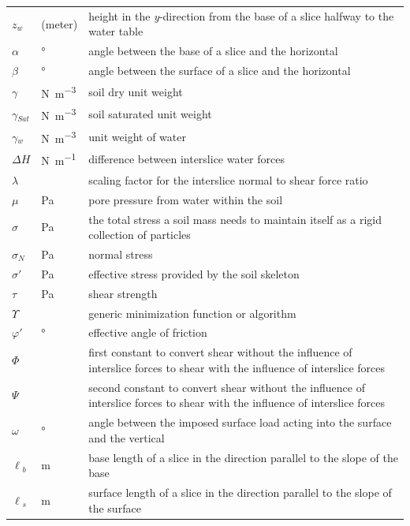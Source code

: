 \documentclass[12pt]{article}
\renewcommand{\arraystretch}{1}
\begin{document}
\begin{longtable*}{  l  l  p{8.5cm}  }
$z_w$ & (\si{meter})& height in the \textit{y}-direction from the base of a 
slice halfway to the water table
\\
$\alpha{}$ & \si{\degree} & angle between the base of a slice and the horizontal
\\
$\beta{}$ &\si{\degree} & angle between the surface of a slice and the 
horizontal
\\
$\gamma{}$ & \si{\newton\per\cubic\meter} & soil dry unit weight
\\
${\gamma{}_{Sat}}$ &  \si{\newton\per\cubic\meter} & soil saturated unit weight
\\
${\gamma{}_{w}}$ & \si{\newton\per\cubic\meter} & unit weight of water
\\
$\Delta{}H$ & \si{\newton\per\meter} & difference between interslice water 
forces
\\
$\lambda{}$ & & scaling factor for the interslice normal to shear force ratio
\\
$\mu{}$ &\si{\pascal} & pore pressure from water within the soil
\\
$\sigma{}$ & \si{\pascal} & the total stress a soil mass needs
to maintain itself as a rigid collection of particles
\\
$\sigma{}_N$ & \si{\pascal} & normal stress
\\
$\sigma{}'$ & \si{\pascal} & effective stress provided by the soil skeleton
\\
$\tau{}$ & \si{\pascal} & shear strength
\\
$\Upsilon{}$ & & generic minimization function or algorithm 
\\
$\varphi{}'$ & \si{\degree} & effective angle of friction
\\
$\Phi{}$ & & first constant to convert shear without the 
influence of interslice forces to shear with the influence of 
interslice forces
\\
$\Psi{}$ & & second constant to convert shear without the 
influence of interslice forces to shear with the influence of interslice 
forces
\\
$\omega{}$ & \si{\degree} & angle between the imposed surface load acting into 
the surface and the vertical
\\
${\ell{}_{b}}$ &  \si{\meter}& base length of a slice in the 
direction parallel to the slope of the base
\\
${\ell{}_{s}}$ &  \si{\meter}& surface length of a slice in the direction 
parallel to the slope of the surface \\

\hline
\end{longtable*}
\renewcommand{\arraystretch}{1}
\end{document}
